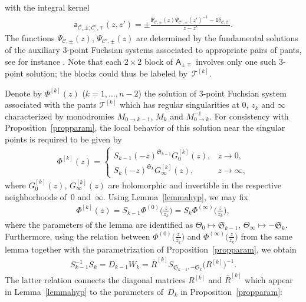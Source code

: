 \documentclass[pdftex]{sigma}
\numberwithin{equation}{section}
\begin{document}
with the integral kernel
\begin{gather}\label{amm2}
\mathsf a_{\mathcal C,\pm;\mathcal C',\mp}(z,z')= \pm \frac{\Psi_{\mathcal C,\pm}(z) {\Psi_{\mathcal C',\pm}(z')}^{-1}-\mathds 1 \delta_{\mathcal C,\mathcal C'}}{z-z'}.
\end{gather}
The functions $\Psi_{\mathcal C,\pm}(z)$, $\Psi_{\mathcal C',\pm}(z)$ are determined by the fundamental solutions of the auxiliary 3-point Fuchsian systems associated to appropriate pairs of pants, see for instance \cite[equations~(3.9)]{CGL}. Note that each $2\times2$ block of $\mathsf A_{\pm\mp}$ involves only one such 3-point solution; the blocks could thus be labeled by~$\mathcal T^{[k]}$.

Denote by $\Phi^{[k]}(z)$ ($k=1,\ldots,n-2$) the solution of 3-point Fuchsian system associated with the pants $\mathcal T^{[k]}$ which has regular singularities at $0$, $z_k$ and $\infty$ characterized by monodromies $M_{0\to k-1}$, $M_{k}$ and $M_{0\to k}^{-1}$. For consistency with Proposition~\ref{propparam}, the local behavior of this solution near the singular points is required to be given by
\begin{gather*}
\Phi^{[k]}(z) = \begin{cases}
S_{k-1} (-z)^{\mathfrak S_{k-1}} G_0^{[k]}(z), & z\to0, \\
 S_{k} (-z)^{\mathfrak S_{k}} G_{\infty}^{[k]}(z), & z\to \infty,
\end{cases}
\end{gather*}
where $G^{[k]}_{0}(z)$, $G^{[k]}_{\infty}(z)$ are holomorphic and invertible in the respective neighborhoods of~$0$ and~$\infty$. Using Lemma~\ref{lemmahyp}, we may fix
\begin{gather*}
\Phi^{[k]}(z) = S_{k-1} \Phi^{(0)}\big(\tfrac{z}{z_k} \big)=S_{k} \Phi^{(\infty)}\big(\tfrac{z}{z_k}\big),
\end{gather*}
where the parameters of the lemma are identified as $\Theta_0\mapsto \mathfrak{S}_{k-1}$, $\Theta_\infty\mapsto -\mathfrak{S}_{k}$. Furthermore, using the relation between $\Phi^{(0)}\big(\frac{z}{z_k}\big)$ and $\Phi^{(\infty)}\big(\frac{z}{z_k}\big)$ from the same lemma together with the parametrization of Proposition~\ref{propparam}, we obtain
\begin{gather*}
S_{k-1}^{-1}S_k = D_{k-1}W_k=\bar R^{[k]} S_{\mathfrak{S}_{k-1},-\mathfrak{S}_{k}} \big(R^{[k]}\big)^{-1}.
\end{gather*}
The latter relation connects the diagonal matrices $R^{[k]}$ and $\bar R^{[k]}$ which appear in Lemma~\ref{lemmahyp} to the parameters of~$D_k$ in Proposition~\ref{propparam}:
\end{document}
